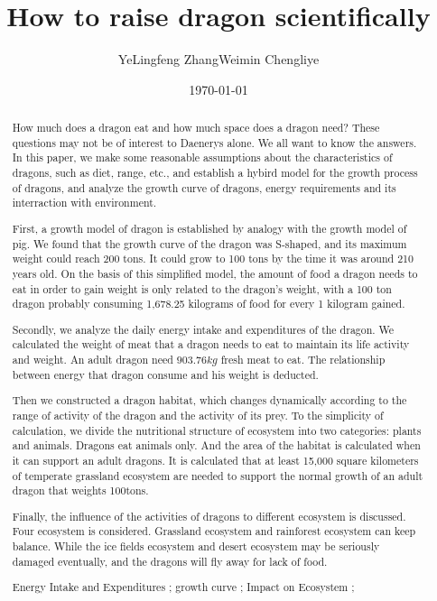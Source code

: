 \documentclass{mcmthesis}
\title{How to raise dragon scientifically}
\author{YeLingfeng  ZhangWeimin  Chengliye}
\date{\today}
\begin{document}
\begin{abstract}
\hspace{2em} How much does a dragon eat and how much space does a dragon need?
These questions may not be of interest to Daenerys alone. We all want to know the answers.
In this paper, we make some reasonable assumptions about the characteristics of dragons, 
such as diet, range, etc., and establish a hybird model for the growth process of dragons, 
and analyze the growth curve of dragons, energy requirements and its interraction with environment.

First, a growth model of dragon is established by analogy with the growth model of pig.
We found that the growth curve of the dragon was S-shaped, and its maximum weight could reach 200 tons. 
It could grow to 100 tons by the time it was around 210 years old.
On the basis of this simplified model, the amount of food a dragon needs to eat in order to gain weight is only related to the dragon's weight, 
with a 100 ton dragon probably consuming 1,678.25 kilograms of food for every 1 kilogram gained.

Secondly, we analyze the daily energy intake and expenditures of the dragon.
We calculated the weight of meat that a dragon needs to eat to maintain its life activity and weight. An adult dragon need $903.76kg$ fresh meat to eat. The relationship between energy that dragon consume and his weight is deducted.

Then we constructed a dragon habitat, which changes dynamically according to the range of activity of the dragon and the activity of its prey.
To the simplicity of calculation, we divide the nutritional structure of ecosystem into two categories: plants and animals. Dragons eat animals only. And the area of the habitat is calculated when it can support an adult dragons. It is calculated that at least 15,000 square kilometers of temperate grassland ecosystem are needed to support the normal growth of an adult dragon that weights 100tons.

Finally, the influence of the activities of dragons to different ecosystem is discussed. Four ecosystem is considered. Grassland ecosystem and rainforest ecosystem can keep balance.
While the ice fields ecosystem and desert ecosystem may be seriously damaged eventually, and the dragons will fly away for lack of food.

\begin{keywords}
Energy Intake and Expenditures ; growth curve ; Impact on Ecosystem ;
\end{keywords}
\end{abstract}
\maketitle
\end{document}
